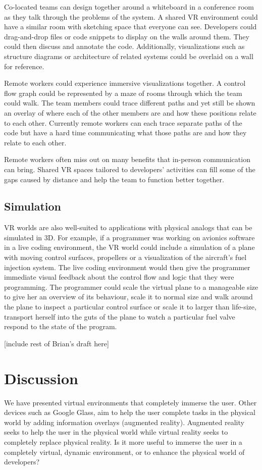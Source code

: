 \documentclass[conference]{IEEEtran}
\begin{document}
Co-located teams can design together around a whiteboard in a conference room as they talk through the problems of the system. 
A shared VR environment could have a similar room with sketching space that everyone can see. 
Developers could drag-and-drop files or code snippets to display on the walls around them. 
They could then discuss and annotate the code. 
Additionally, visualizations such as structure diagrams or architecture of related systems could be overlaid on a wall for reference.

Remote workers could experience immersive visualizations together. 
A control flow graph could be represented by a maze of rooms through which the team could walk. 
The team members could trace different paths and yet still be shown an overlay of where each of the other members are and how these positions relate to each other. 
Currently remote workers can each trace separate paths of the code but have a hard time communicating what those paths are and how they relate to each other.

Remote workers often miss out on many benefits that in-person communication can bring. 
Shared VR spaces tailored to developers' activities can fill some of the gaps caused by distance and help the team to function better together. 

\subsection{Simulation}
VR worlds are also well-suited to applications with physical analogs that can be simulated in 3D. 
For example, if a programmer was working on avionics software in a live coding environment, the VR world could include a simulation of a plane with moving control surfaces, propellers or a visualization of the aircraft's fuel injection system. 
The live coding environment would then give the programmer immediate visual feedback about the control flow and logic that they were programming. 
The programmer could scale the virtual plane to a manageable size to give her an overview of its behaviour, scale it to normal size and walk around the plane to inspect a particular control surface or scale it to larger than life-size, transport herself into the guts of the plane to watch a particular fuel valve respond to the state of the program.

[include rest of Brian's draft here]

\section{Discussion}
We have presented virtual environments that completely immerse the user. 
Other devices such as Google Glass, aim to help the user complete tasks in the physical world by adding information overlays (augmented reality). 
Augmented reality seeks to help the user in the physical world while virtual reality seeks to completely replace physical reality. 
Is it more useful to immerse the user in a completely virtual, dynamic environment, or to enhance the physical world of developers?
  
\end{document}

